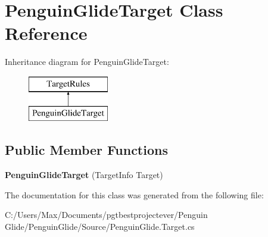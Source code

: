 \hypertarget{class_penguin_glide_target}{}\section{Penguin\+Glide\+Target Class Reference}
\label{class_penguin_glide_target}
Inheritance diagram for Penguin\+Glide\+Target\+:\begin{figure}[H]
\begin{center}
\leavevmode
\includegraphics[height=2.000000cm]{class_penguin_glide_target}
\end{center}
\end{figure}
\subsection*{Public Member Functions}
\begin{DoxyCompactItemize}
\item 
\mbox{\label{class_penguin_glide_target_a037c66701c2e7c967893d9d4322ff4c2}} 
{\bfseries Penguin\+Glide\+Target} (Target\+Info Target)
\end{DoxyCompactItemize}


The documentation for this class was generated from the following file\+:\begin{DoxyCompactItemize}
\item 
C\+:/\+Users/\+Max/\+Documents/pgtbestprojectever/\+Penguin Glide/\+Penguin\+Glide/\+Source/Penguin\+Glide.\+Target.\+cs\end{DoxyCompactItemize}
